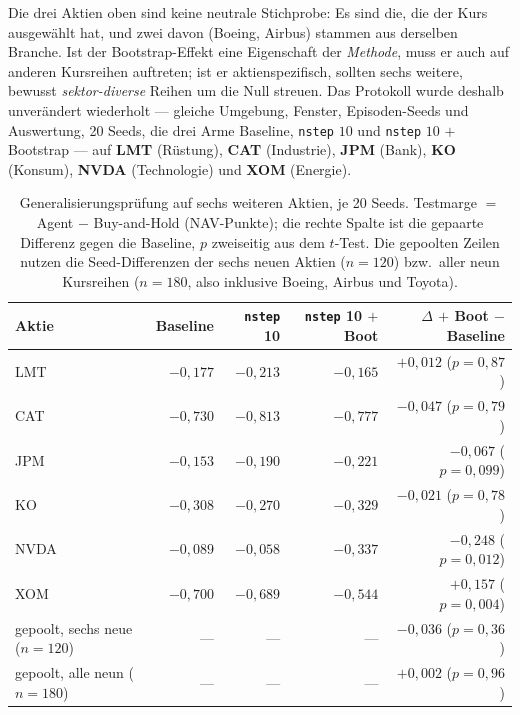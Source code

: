 Die drei Aktien oben sind keine neutrale Stichprobe: Es sind die, die der Kurs ausgewählt
hat, und zwei davon (Boeing, Airbus) stammen aus derselben Branche. Ist der Bootstrap-Effekt
eine Eigenschaft der \emph{Methode}, muss er auch auf anderen Kursreihen auftreten; ist er
aktienspezifisch, sollten sechs weitere, bewusst \emph{sektor-diverse} Reihen um die Null
streuen. Das Protokoll wurde deshalb unverändert wiederholt --- gleiche Umgebung, Fenster,
Episoden-Seeds und Auswertung, 20 Seeds, die drei Arme Baseline, \texttt{nstep} $10$ und
\texttt{nstep} $10$ $+$ Bootstrap --- auf \textbf{LMT} (Rüstung), \textbf{CAT} (Industrie),
\textbf{JPM} (Bank), \textbf{KO} (Konsum), \textbf{NVDA} (Technologie) und \textbf{XOM}
(Energie).

\begin{table}[H]
  \centering
  \caption{Generalisierungsprüfung auf sechs weiteren Aktien, je 20 Seeds. Testmarge $=$
           Agent $-$ Buy-and-Hold (NAV-Punkte); die rechte Spalte ist die gepaarte Differenz
           gegen die Baseline, $p$ zweiseitig aus dem $t$-Test. Die gepoolten Zeilen nutzen
           die Seed-Differenzen der sechs neuen Aktien ($n=120$) bzw.\ aller neun Kursreihen
           ($n=180$, also inklusive Boeing, Airbus und Toyota).}
  \label{tab:a3c-generalisierung}
  \small
  \begin{tabular}{lrrrr}
    \toprule
    Aktie & Baseline & \texttt{nstep} 10 & \texttt{nstep} 10 $+$ Boot & $\Delta$ $+$ Boot $-$ Baseline\\
    \midrule
    LMT  & $-0{,}177$ & $-0{,}213$ & $-0{,}165$ & $+0{,}012$ ($p=0{,}87$)\\
    CAT  & $-0{,}730$ & $-0{,}813$ & $-0{,}777$ & $-0{,}047$ ($p=0{,}79$)\\
    JPM  & $-0{,}153$ & $-0{,}190$ & $-0{,}221$ & $-0{,}067$ ($p=0{,}099$)\\
    KO   & $-0{,}308$ & $-0{,}270$ & $-0{,}329$ & $-0{,}021$ ($p=0{,}78$)\\
    NVDA & $-0{,}089$ & $-0{,}058$ & $-0{,}337$ & $-0{,}248$ ($p=0{,}012$)\\
    XOM  & $-0{,}700$ & $-0{,}689$ & $-0{,}544$ & $+0{,}157$ ($p=0{,}004$)\\
    \midrule
    gepoolt, sechs neue ($n=120$)  & --- & --- & --- & $-0{,}036$ ($p=0{,}36$)\\
    gepoolt, alle neun ($n=180$)   & --- & --- & --- & $+0{,}002$ ($p=0{,}96$)\\
    \bottomrule
  \end{tabular}
\end{table}

